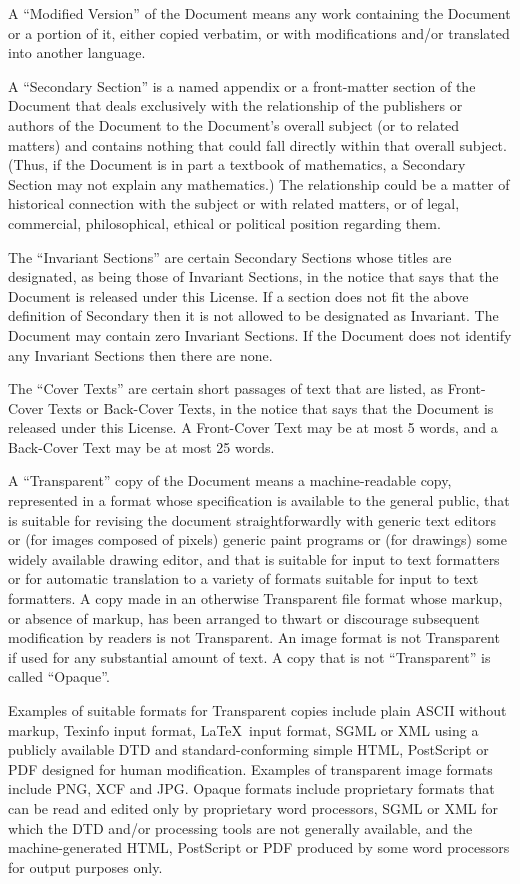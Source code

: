 \documentclass[10pt,a4paper,titlepage,twoside,openright]{report}
\begin{document}
A ``Modified Version'' of the Document means any work containing the
Document or a portion of it, either copied verbatim, or with
modifications and/or translated into another language.

A ``Secondary Section'' is a named appendix or a front-matter section of
the Document that deals exclusively with the relationship of the
publishers or authors of the Document to the Document's overall subject
(or to related matters) and contains nothing that could fall directly
within that overall subject.  (Thus, if the Document is in part a
textbook of mathematics, a Secondary Section may not explain any
mathematics.)  The relationship could be a matter of historical
connection with the subject or with related matters, or of legal,
commercial, philosophical, ethical or political position regarding
them.

The ``Invariant Sections'' are certain Secondary Sections whose titles
are designated, as being those of Invariant Sections, in the notice
that says that the Document is released under this License.  If a
section does not fit the above definition of Secondary then it is not
allowed to be designated as Invariant.  The Document may contain zero
Invariant Sections.  If the Document does not identify any Invariant
Sections then there are none.

The ``Cover Texts'' are certain short passages of text that are listed,
as Front-Cover Texts or Back-Cover Texts, in the notice that says that
the Document is released under this License.  A Front-Cover Text may
be at most 5 words, and a Back-Cover Text may be at most 25 words.

A ``Transparent'' copy of the Document means a machine-readable copy,
represented in a format whose specification is available to the
general public, that is suitable for revising the document
straightforwardly with generic text editors or (for images composed of
pixels) generic paint programs or (for drawings) some widely available
drawing editor, and that is suitable for input to text formatters or
for automatic translation to a variety of formats suitable for input
to text formatters.  A copy made in an otherwise Transparent file
format whose markup, or absence of markup, has been arranged to thwart
or discourage subsequent modification by readers is not Transparent.
An image format is not Transparent if used for any substantial amount
of text.  A copy that is not ``Transparent'' is called ``Opaque''.

Examples of suitable formats for Transparent copies include plain
ASCII without markup, Texinfo input format, \LaTeX\ input format, SGML
or XML using a publicly available DTD and standard-conforming simple
HTML, PostScript or PDF designed for human modification. Examples of
transparent image formats include PNG, XCF and JPG. Opaque formats
include proprietary formats that can be read and edited only by
proprietary word processors, SGML or XML for which the DTD and/or
processing tools are not generally available, and the
machine-generated HTML, PostScript or PDF produced by some word
processors for output purposes only.
\end{document}

